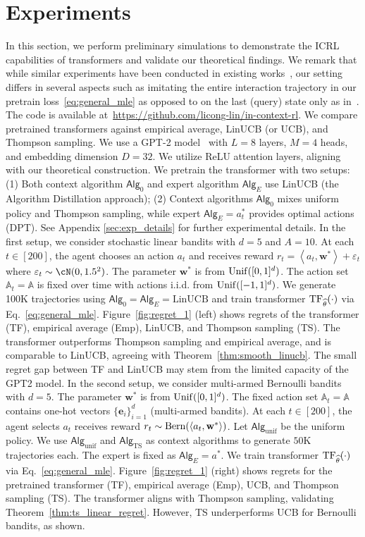 \documentclass[10pt]{article}
\newcommand{\eps}{\varepsilon}
\newcommand{\<}{\left\langle}
\renewcommand{\>}{\right\rangle}
\newcommand{\TF}{{\rm TF}}
\newcommand{\LinUCB}{{\mathrm{LinUCB}}}
\newcommand{\TS}{{\mathrm{TS}}}
\newcommand{\action}{{a}}
\newcommand{\reward}{{r}}
\newcommand{\sAlg}{{\mathsf{Alg}}}
\newcommand{\EstPar}{{\widehat{\theta}}}
\newcommand{\shortexp}{{E}}
\def\sA{{\mathbb{A}}}
\def\be{{\mathbf e}}
\def\bw{{\mathbf w}}
\begin{document}
\section{Experiments}
\label{sec:experiments}
In this section, we perform preliminary simulations to demonstrate the ICRL capabilities of transformers and validate our theoretical findings. We remark that while similar experiments have been conducted in existing works~\citep{laskin2022context,lee2023supervised}, our setting differs in several aspects such as imitating the entire interaction trajectory in our pretrain loss~\eqref{eq:general_mle} as opposed to on the last (query) state only as in~\citet{lee2023supervised}. The code is available at~\href{https://github.com/licong-lin/in-context-rl}{https://github.com/licong-lin/in-context-rl}.
We compare pretrained transformers against empirical average, LinUCB (or UCB), and Thompson sampling. We use a GPT-2 model~\cite{garg2022can,lee2023supervised} with $L = 8$ layers, $M=4$ heads, and embedding dimension $D=32$. We utilize ReLU attention layers, aligning with our theoretical construction. We pretrain the transformer with two setups: (1) Both context algorithm $\sAlg_0$ and expert algorithm $\sAlg_{\shortexp}$ use LinUCB (the Algorithm Distillation approach); (2) Context algorithms $\sAlg_0$ mixes uniform policy and Thompson sampling, while expert $\sAlg_{\shortexp} = \action_t^*$ provides optimal actions (DPT). See Appendix \ref{sec:exp_details} for further experimental details.
In the first setup, we consider stochastic linear bandits with $d=5$ and $A=10$. At each $t \in [200]$, the agent chooses an action $\action_t$ and receives reward $\reward_t=\<\action_t,\bw^*\>+\eps_t$ where $\eps_t\sim\cN(0,1.5^2)$. The parameter $\bw^*$ is from ${\rm Unif}([0,1]^d)$. The action set $\sA_t=\sA$ is fixed over time with actions i.i.d. from ${\rm Unif}([-1, 1]^d)$. We generate 100K trajectories using $\sAlg_0=\sAlg_{\shortexp}=\LinUCB$ and train transformer $\TF_\EstPar(\cdot)$ via Eq.~\eqref{eq:general_mle}. Figure~\ref{fig:regret_1} (left) shows regrets of the transformer (TF), empirical average (Emp), LinUCB, and Thompson sampling (TS). The transformer outperforms Thompson sampling and empirical average, and is comparable to LinUCB, agreeing with Theorem~\ref{thm:smooth_linucb}. The small regret gap between TF and LinUCB may stem from the limited capacity of the GPT2 model.
In the second setup, we consider multi-armed Bernoulli bandits with $d = 5$. The parameter $\bw^*$ is from ${\rm Unif}([0,1]^d)$. The fixed action set $\sA_t=\sA$ contains one-hot vectors $\{\be_i\}_{i=1}^d$ (multi-armed bandits). At each $t \in [200]$, the agent selects $\action_t$ receives reward $r_t \sim {\rm Bern}(\<\action_t,\bw^*\>)$. Let $\sAlg_{\mathrm{unif}}$ be the uniform policy. We use $\sAlg_{\mathrm{unif}}$ and $\sAlg_\TS$ as context algorithms to generate $50$K trajectories each. The expert is fixed as $\sAlg_\shortexp=\action^*$. We train transformer $\TF_\EstPar(\cdot)$ via Eq.~\eqref{eq:general_mle}. Figure~\ref{fig:regret_1} (right) shows regrets for the pretrained transformer (TF), empirical average (Emp), UCB, and Thompson sampling (TS).  The transformer aligns with Thompson sampling, validating Theorem~\ref{thm:ts_linear_regret}. However, TS underperforms UCB for Bernoulli bandits, as shown.
\end{document}
